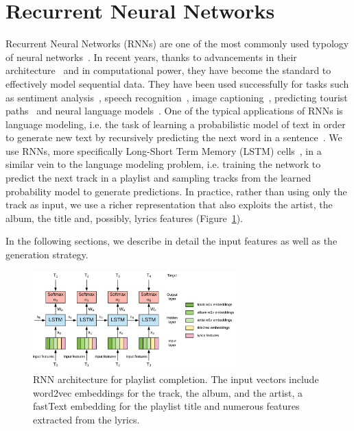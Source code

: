 \section{Recurrent Neural Networks}
\label{sec:rnn}
Recurrent Neural Networks (RNNs) are one of the most commonly used typology of neural networks~\cite{lecun2015deep}. In recent years, thanks to advancements in their architecture~\cite{hochreiter1997long,chung2014empirical} and in computational power, they have become the standard to effectively model sequential data. They have been used successfully for tasks such as sentiment analysis~\cite{tang2015document}, speech recognition~\cite{graves2013speech}, image captioning~\cite{karpathy2015deep}, predicting tourist paths~\cite{palumbo2017predicting} and neural language models~\cite{mikolov2010recurrent}. One of the typical applications of RNNs is language modeling, i.e. the task of learning a probabilistic model of text in order to generate new text by recursively predicting the next word in a sentence~\cite{sutskever2011generating}. We use RNNs, more specifically Long-Short Term Memory (LSTM) cells~\cite{hochreiter1997long}, in a similar vein to the language modeling problem, i.e. training the network to predict the next track in a playlist and sampling tracks from the learned probability model to generate predictions. In practice, rather than using only the track as input, we use a richer representation that also exploits the artist, the album, the title and, possibly, lyrics features (Figure~\ref{fig:global_architecture}). 

In the following sections, we describe in detail the input features as well as the generation strategy.

\begin{figure}
    \centering
    \includegraphics[width=0.7\textwidth, height=0.35\textwidth]{figures/rnn.pdf}
    \caption{RNN architecture for playlist completion. The input vectors include word2vec embeddings for the track, the album, and the artist, a fastText embedding for the playlist title and numerous features extracted from the lyrics.}
    \label{fig:global_architecture}
\end{figure}

